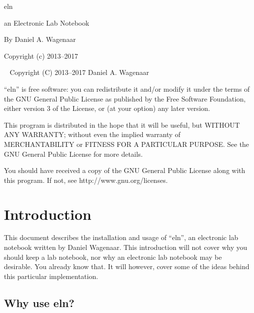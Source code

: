 \documentclass[11pt]{report}
\begin{document}
\thispagestyle{empty}
\begin{centering}
  {\Huge eln}
  \vskip30pt

  {\Large an Electronic Lab Notebook}
  \vskip60pt

  {\large By Daniel A. Wagenaar}
  \vfill
  
  {Copyright (c) 2013--2017}
  
\end{centering}
\pagebreak
~
\vfill
\noindent Copyright (C) 2013--2017 Daniel A. Wagenaar\medskip

``eln'' is free software: you can redistribute it and/or modify
it under the terms of the GNU General Public License as published by
the Free Software Foundation, either version 3 of the License, or
(at your option) any later version.

This program is distributed in the hope that it will be useful,
but WITHOUT ANY WARRANTY; without even the implied warranty of
MERCHANTABILITY or FITNESS FOR A PARTICULAR PURPOSE.  See the
GNU General Public License for more details.

You should have received a copy of the GNU General Public License
along with this program.  If not, see http://www.gnu.org/licenses.
\pagebreak

\chapter{Introduction}

This document describes the installation and usage of ``eln'', an
electronic lab notebook written by Daniel Wagenaar.  This introduction
will not cover why you should keep a lab notebook, nor why an
electronic lab notebook may be desirable. You already know that.  It
will however, cover some of the ideas behind this particular
implementation.

\section{Why use eln?}
\end{document}
